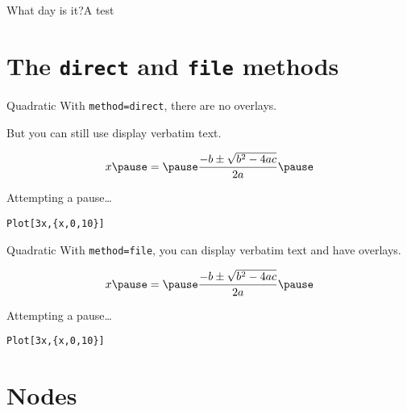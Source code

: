 \documentclass[style=klope,clock,hlsections]{powerdot}
\begin{document}
\begin{slide}[toc=What day is it?,bm=What day is it?,method=direct,
              dprop={dotstyle=*},dminsize=4pt,dmaxsize=20pt,
              dmindots=30,dmaxdots=30]{What day is it?\hfill A test}
\end{slide}

\section[slide=false]{The \texttt{direct} and \texttt{file} methods}

\begin{slide}[method=direct,randomdots=false]{Quadratic}
  With \verb|method=direct|, there are no overlays.\pause

  But you can still use display verbatim text.

  \[
    x \pause = \pause \frac{-b \pm \sqrt{b^2 - 4ac}}{2a} \pause
  \]

  Attempting \pause a \pause pause\ldots\pause

  \verb|Plot[3x,{x,0,10}]|
\end{slide}

\begin{slide}[method=file,randomdots=false]{Quadratic}
  With \verb|method=file|, \pause you can display verbatim text and have overlays.\pause

  \[
    x \pause = \pause \frac{-b \pm \sqrt{b^2 - 4ac}}{2a} \pause
  \]

  Attempting \pause a \pause pause\ldots\pause

  \verb|Plot[3x,{x,0,10}]|
\end{slide}

\section[slide=false]{Nodes}
\end{document}
